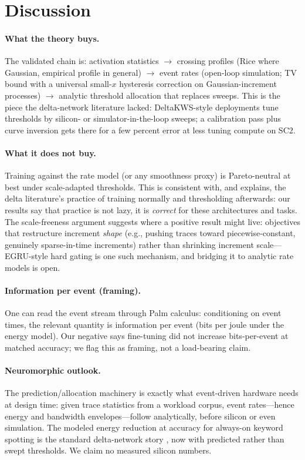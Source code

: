 \documentclass[10pt]{article}
\begin{document}
\section{Discussion}
\label{sec:discussion}

\paragraph{What the theory buys.}
The validated chain is: activation statistics $\to$ crossing profiles
(Rice where Gaussian, empirical profile in general) $\to$ event rates
(open-loop simulation; TV bound with a universal small-$x$ hysteresis
correction on Gaussian-increment processes) $\to$ analytic threshold
allocation that replaces sweeps. This is the piece the delta-network
literature lacked: DeltaKWS-style deployments tune thresholds by silicon-
or simulator-in-the-loop sweeps; a calibration pass plus curve inversion
gets there for a few percent error at \TuneCostRatioSCTwo{} less tuning
compute on SC2.

\paragraph{What it does not buy.}
Training against the rate model (or any smoothness proxy) is
Pareto-neutral at best under scale-adapted thresholds. This is consistent
with, and explains, the delta literature's practice of training normally
and thresholding afterwards: our results say that practice is not lazy, it
is \emph{correct} for these architectures and tasks. The scale-freeness
argument suggests where a positive result might live: objectives that
restructure increment \emph{shape} (e.g., pushing traces toward
piecewise-constant, genuinely sparse-in-time increments) rather than
shrinking increment scale---EGRU-style hard gating \citep{subramoney2023egru}
is one such mechanism, and bridging it to analytic rate models is open.

\paragraph{Information per event (framing).}
One can read the event stream through Palm calculus: conditioning on event
times, the relevant quantity is information per event (bits per joule
under the energy model). Our negative says fine-tuning did not increase
bits-per-event at matched accuracy; we flag this as framing, not a
load-bearing claim.

\paragraph{Neuromorphic outlook.}
The prediction/allocation machinery is exactly what event-driven hardware
needs at design time: given trace statistics from a workload corpus, event
rates---hence energy and bandwidth envelopes---follow analytically, before
silicon or even simulation. The modeled \EnergyRatioAtTwenty{} energy
reduction at \AccAtTwentySCTwo{} accuracy for always-on keyword spotting is
the standard delta-network story \citep{chen2024deltakws}, now with
predicted rather than swept thresholds. We claim no measured silicon
numbers.
\end{document}
